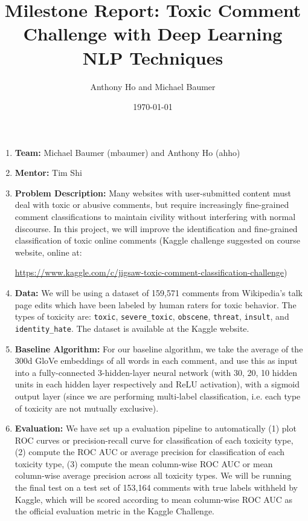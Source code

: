 \documentclass{article}
\title{Milestone Report: Toxic Comment Challenge with Deep Learning NLP Techniques}
\author{Anthony Ho and Michael Baumer}
\date{\today}
\begin{document}
\maketitle

\begin{enumerate}
    \item \textbf{Team:} Michael Baumer (mbaumer) and Anthony Ho (ahho)
    \item \textbf{Mentor:} Tim Shi
    \item \textbf{Problem Description:} Many websites with user-submitted content must deal with toxic or abusive comments, but require increasingly fine-grained comment classifications to maintain civility without interfering with normal discourse. In this project, we will improve the identification and fine-grained classification of toxic online comments (Kaggle challenge suggested on course website, online at:
    
    \url{https://www.kaggle.com/c/jigsaw-toxic-comment-classification-challenge})
    
    \item \textbf{Data:} We will be using a dataset of 159,571 comments from Wikipedia’s talk page edits which have been labeled by human raters for toxic behavior. The types of toxicity are: \texttt{toxic}, \texttt{severe\_toxic}, \texttt{obscene}, \texttt{threat}, \texttt{insult}, and \texttt{identity\_hate}. The dataset is available at the Kaggle website. 
    
    \item \textbf{Baseline Algorithm:} For our baseline algorithm, we take the average of the 300d GloVe embeddings of all words in each comment, and use this as input into a fully-connected 3-hidden-layer neural network (with 30, 20, 10 hidden units in each hidden layer respectively and ReLU activation), with a sigmoid output layer (since we are performing multi-label classification, i.e. each type of toxicity are not mutually exclusive).
    
    \item \textbf{Evaluation:} We have set up a evaluation pipeline to automatically (1) plot ROC curves or precision-recall curve for classification of each toxicity type, (2) compute the ROC AUC or average precision for classification of each toxicity type, (3) compute the mean column-wise ROC AUC or mean column-wise average precision across all toxicity types. We will be running the final test on a test set of 153,164 comments with true labels withheld by Kaggle, which will be scored according to mean column-wise ROC AUC as the official evaluation metric in the Kaggle Challenge.
    

\end{enumerate}
\end{document}
